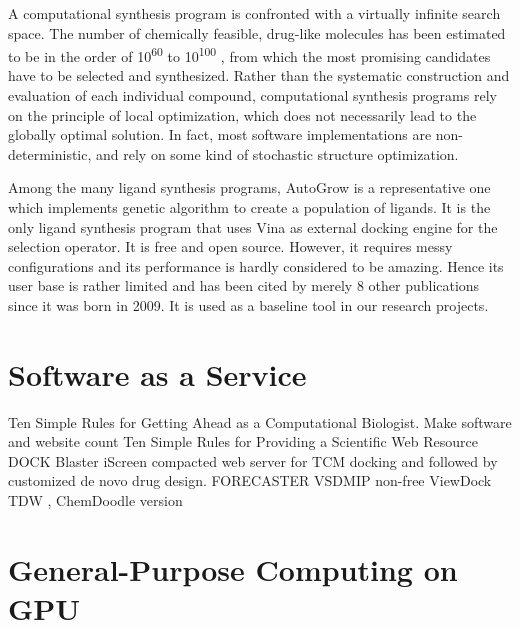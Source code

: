 A computational synthesis program is confronted with a virtually infinite search space. The number of chemically feasible, drug-like molecules has been estimated to be in the order of 10\textsuperscript{60} to 10\textsuperscript{100} \citep{1104}, from which the most promising candidates have to be selected and synthesized. Rather than the systematic construction and evaluation of each individual compound, computational synthesis programs rely on the principle of local optimization, which does not necessarily lead to the globally optimal solution. In fact, most software implementations \citep{466,749} are non-deterministic, and rely on some kind of stochastic structure optimization.



Among the many ligand synthesis programs, AutoGrow \citep{466} is a representative one which implements genetic algorithm to create a population of ligands. It is the only ligand synthesis program that uses Vina \citep{595} as external docking engine for the selection operator. It is free and open source. However, it requires messy configurations and its performance is hardly considered to be amazing. Hence its user base is rather limited and has been cited by merely 8 other publications since it was born in 2009. It is used as a baseline tool in our research projects.

\section{Software as a Service}

Ten Simple Rules for Getting Ahead as a Computational Biologist. Make software and website count \citep{260}
Ten Simple Rules for Providing a Scientific Web Resource \citep{677}
DOCK Blaster \citep{557}
iScreen \citep{899} compacted web server for TCM docking and followed by customized de novo drug design.
FORECASTER \citep{1012}
VSDMIP \citep{848} non-free
ViewDock TDW \citep{559}, ChemDoodle version

\section{General-Purpose Computing on GPU}


